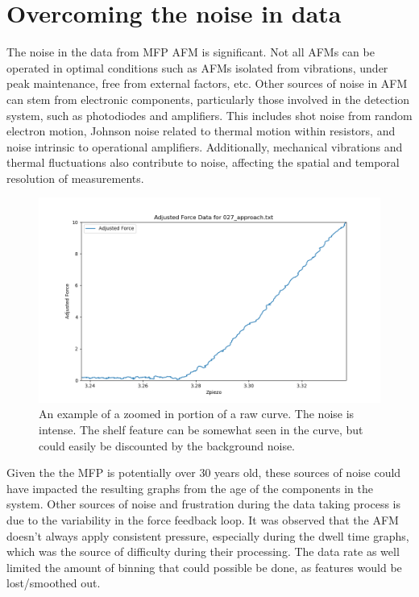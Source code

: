 \section{Overcoming the noise in data}

The noise in the data from MFP AFM is significant. Not all AFMs can be operated in optimal conditions such as AFMs isolated from vibrations, under peak maintenance, free from external factors, etc. Other sources of noise in AFM can stem from electronic components, particularly those involved in the detection system, such as photodiodes and amplifiers. This includes shot noise from random electron motion, Johnson noise related to thermal motion within resistors, and noise intrinsic to operational amplifiers. Additionally, mechanical vibrations and thermal fluctuations also contribute to noise, affecting the spatial and temporal resolution of measurements. \cite{gittes1997signals}

\begin{figure}[h!]
\centering
\includegraphics[width=\textwidth]{chapter8/Shelf/027_approach_zoom.png}
\caption{An example of a zoomed in portion of a raw curve. The noise is intense. The shelf feature can be somewhat seen in the curve, but could easily be discounted by the background noise.}
\label{fig:noisey}
\end{figure}

Given the the MFP is potentially over 30 years old, these sources of noise could have impacted the resulting graphs from the age of the components in the system. Other sources of noise and frustration during the data taking process is due to the variability in the force feedback loop. It was observed that the AFM doesn't always apply consistent pressure, especially during the dwell time graphs, which was the source of difficulty during their processing. The data rate as well limited the amount of binning that could possible be done, as features would be lost/smoothed out. 

